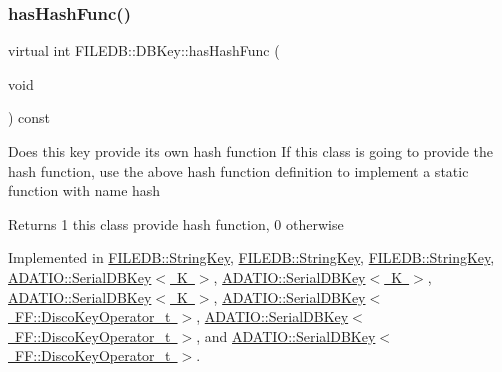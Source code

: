 \mbox{\label{classFILEDB_1_1DBKey_a541dab4f4083ae951dee2f30483eb18e}} 
\subsubsection{\texorpdfstring{hasHashFunc()}{hasHashFunc()}\hspace{0.1cm}{\footnotesize\ttfamily [1/3]}}
{\footnotesize\ttfamily virtual int F\+I\+L\+E\+D\+B\+::\+D\+B\+Key\+::has\+Hash\+Func (\begin{DoxyParamCaption}\item[{void}]{ }\end{DoxyParamCaption}) const\hspace{0.3cm}{\ttfamily [pure virtual]}}

Does this key provide its own hash function If this class is going to provide the hash function, use the above hash function definition to implement a static function with name hash

\begin{DoxyReturn}{Returns}
1 this class provide hash function, 0 otherwise 
\end{DoxyReturn}


Implemented in \mbox{\hyperlink{classFILEDB_1_1StringKey_afb2fa99d53c0f4b5aeca0377228ea722}{F\+I\+L\+E\+D\+B\+::\+String\+Key}}, \mbox{\hyperlink{classFILEDB_1_1StringKey_afb2fa99d53c0f4b5aeca0377228ea722}{F\+I\+L\+E\+D\+B\+::\+String\+Key}}, \mbox{\hyperlink{classFILEDB_1_1StringKey_afb2fa99d53c0f4b5aeca0377228ea722}{F\+I\+L\+E\+D\+B\+::\+String\+Key}}, \mbox{\hyperlink{classADATIO_1_1SerialDBKey_ae8926cd9bdef006f3729f4b724a2e2fe}{A\+D\+A\+T\+I\+O\+::\+Serial\+D\+B\+Key$<$ K $>$}}, \mbox{\hyperlink{classADATIO_1_1SerialDBKey_ae8926cd9bdef006f3729f4b724a2e2fe}{A\+D\+A\+T\+I\+O\+::\+Serial\+D\+B\+Key$<$ K $>$}}, \mbox{\hyperlink{classADATIO_1_1SerialDBKey_ae8926cd9bdef006f3729f4b724a2e2fe}{A\+D\+A\+T\+I\+O\+::\+Serial\+D\+B\+Key$<$ K $>$}}, \mbox{\hyperlink{classADATIO_1_1SerialDBKey_ae8926cd9bdef006f3729f4b724a2e2fe}{A\+D\+A\+T\+I\+O\+::\+Serial\+D\+B\+Key$<$ F\+F\+::\+Disco\+Key\+Operator\+\_\+t $>$}}, \mbox{\hyperlink{classADATIO_1_1SerialDBKey_ae8926cd9bdef006f3729f4b724a2e2fe}{A\+D\+A\+T\+I\+O\+::\+Serial\+D\+B\+Key$<$ F\+F\+::\+Disco\+Key\+Operator\+\_\+t $>$}}, and \mbox{\hyperlink{classADATIO_1_1SerialDBKey_ae8926cd9bdef006f3729f4b724a2e2fe}{A\+D\+A\+T\+I\+O\+::\+Serial\+D\+B\+Key$<$ F\+F\+::\+Disco\+Key\+Operator\+\_\+t $>$}}.

